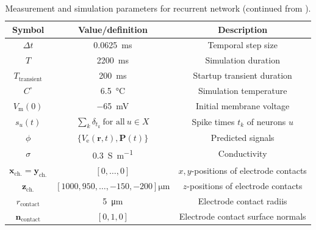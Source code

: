 \begin{table}[!htp]
\caption{ Measurement and simulation parameters for recurrent network (continued from ).}
\begin{center}
\begin{tabular}{|c|c|c|}
\hline
Symbol & Value/definition & Description \\
\hline
$\Delta t$ & \SI{0.0625}{\milli\second} & Temporal step size \\
$T$ & \SI{2200}{\milli\second} & Simulation duration \\
$T_\text{transient}$ &  \SI{200}{\milli\second} & Startup transient duration  \\
$C^\circ$ & \SI{6.5}{\celsius} & Simulation temperature \\
$V_\text{m}(0)$ & \SI{-65}{\milli\volt} & Initial membrane voltage \\
\hline
$s_u(t)$ & $\sum_k \delta_{t_k}~\text{for all}~u \in X $ & Spike times $t_k$ of neurons $u$ \\
\hline
$\phi$ & $\{V_\text{e}(\mathbf{r}, t), \mathbf{P}(t) \} $ & Predicted signals \\ 
$\sigma$ & \SI{0.3}{\siemens\per\metre} & Conductivity \\
$\mathbf{x}_\text{ch.}=\mathbf{y}_\text{ch.}$ & $[0, \ldots, 0 ]$ & $x,y$-positions of electrode contacts \\
$\mathbf{z}_\text{ch.}$ & $[1000, 950, \ldots, -150, -200 ]\si{\micro\metre}$  & $z$-positions of electrode contacts \\
$r_\text{contact}$ & \SI{5}{\micro\metre} & Electrode contact radiis \\
$\mathbf{n}_\text{contact}$ & $[0, 1, 0]$ & Electrode contact surface normals \\
\hline
\end{tabular}
\end{center}
\label{tab:Ch-LFPy:MC-network-III}
\end{table}

